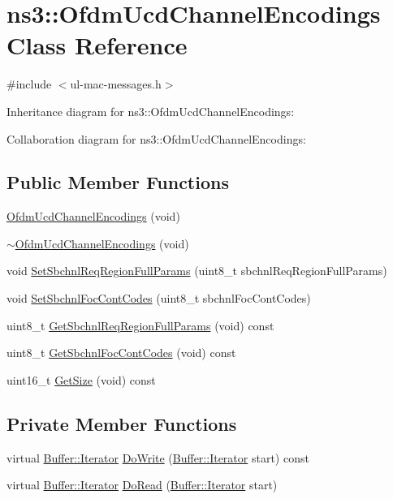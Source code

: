 \hypertarget{classns3_1_1OfdmUcdChannelEncodings}{}\section{ns3\+:\+:Ofdm\+Ucd\+Channel\+Encodings Class Reference}
\label{classns3_1_1OfdmUcdChannelEncodings}


{\ttfamily \#include $<$ul-\/mac-\/messages.\+h$>$}



Inheritance diagram for ns3\+:\+:Ofdm\+Ucd\+Channel\+Encodings\+:


Collaboration diagram for ns3\+:\+:Ofdm\+Ucd\+Channel\+Encodings\+:
\subsection*{Public Member Functions}
\begin{DoxyCompactItemize}
\item 
\hyperlink{classns3_1_1OfdmUcdChannelEncodings_aa75bc36d242c110b375322abfc472354}{Ofdm\+Ucd\+Channel\+Encodings} (void)
\item 
\hyperlink{classns3_1_1OfdmUcdChannelEncodings_a3c94063ec95786d42afb670b33559600}{$\sim$\+Ofdm\+Ucd\+Channel\+Encodings} (void)
\item 
void \hyperlink{classns3_1_1OfdmUcdChannelEncodings_aab2a8a15e484e0fa476190f390857211}{Set\+Sbchnl\+Req\+Region\+Full\+Params} (uint8\+\_\+t sbchnl\+Req\+Region\+Full\+Params)
\item 
void \hyperlink{classns3_1_1OfdmUcdChannelEncodings_abfdb61d6d103b36ac89df0ad513c523b}{Set\+Sbchnl\+Foc\+Cont\+Codes} (uint8\+\_\+t sbchnl\+Foc\+Cont\+Codes)
\item 
uint8\+\_\+t \hyperlink{classns3_1_1OfdmUcdChannelEncodings_adce6781af907fb0519833a631826c8f7}{Get\+Sbchnl\+Req\+Region\+Full\+Params} (void) const 
\item 
uint8\+\_\+t \hyperlink{classns3_1_1OfdmUcdChannelEncodings_a5752671cfcef292841012520aa32707d}{Get\+Sbchnl\+Foc\+Cont\+Codes} (void) const 
\item 
uint16\+\_\+t \hyperlink{classns3_1_1OfdmUcdChannelEncodings_ad821ffe4f5b60f548449d11972223d8f}{Get\+Size} (void) const 
\end{DoxyCompactItemize}
\subsection*{Private Member Functions}
\begin{DoxyCompactItemize}
\item 
virtual \hyperlink{classns3_1_1Buffer_1_1Iterator}{Buffer\+::\+Iterator} \hyperlink{classns3_1_1OfdmUcdChannelEncodings_a94fd816ed4fb78f80234683f1d4c1e38}{Do\+Write} (\hyperlink{classns3_1_1Buffer_1_1Iterator}{Buffer\+::\+Iterator} start) const 
\item 
virtual \hyperlink{classns3_1_1Buffer_1_1Iterator}{Buffer\+::\+Iterator} \hyperlink{classns3_1_1OfdmUcdChannelEncodings_ae47eb4b5a5310f3fa797321cf5b32e04}{Do\+Read} (\hyperlink{classns3_1_1Buffer_1_1Iterator}{Buffer\+::\+Iterator} start)
\end{DoxyCompactItemize}

